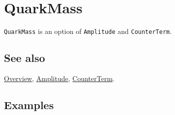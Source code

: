 \documentclass[../FeynCalcManual.tex]{subfiles}
\begin{document}
\hypertarget{quarkmass}{%
\section{QuarkMass}\label{quarkmass}}

\texttt{QuarkMass} is an option of \texttt{Amplitude} and
\texttt{CounterTerm}.

\subsection{See also}

\hyperlink{toc}{Overview}, \hyperlink{amplitude}{Amplitude},
\hyperlink{counterterm}{CounterTerm}.

\subsection{Examples}
\end{document}
